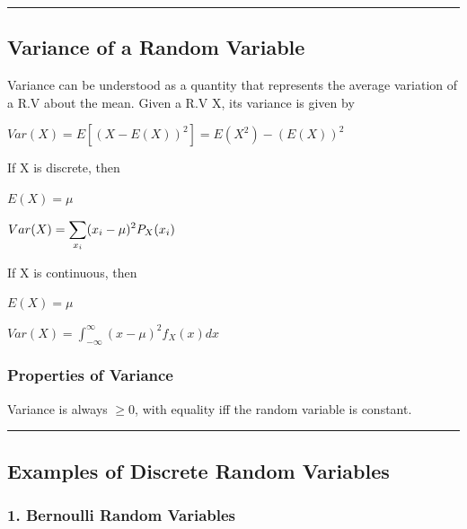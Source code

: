 \begin{center}\rule{0.5\linewidth}{0.5pt}\end{center}

\hypertarget{variance-of-a-random-variable}{%
\subsection{Variance of a Random
Variable}\label{variance-of-a-random-variable}}

Variance can be understood as a quantity that represents the average
variation of a R.V about the mean. Given a R.V X, its variance is given
by

\(Var(X) = E[(X - E(X))^2] = E(X^2) - (E(X))^2\)

If X is discrete, then

\(E(X) = \mu\)

\(Var(X) = \displaystyle\displaystyle\sum_{x_i}(x_i-\mu)^2P_X(x_i)\)

If X is continuous, then

\(E(X) = \mu\)

\(Var(X) = \displaystyle\int_{-\infty}^{\infty}(x-\mu)^2f_X(x)dx\)

\hypertarget{properties-of-variance}{%
\subsubsection{Properties of Variance}\label{properties-of-variance}}

Variance is always \(\geq0\), with equality iff the random variable is
constant.

\begin{center}\rule{0.5\linewidth}{0.5pt}\end{center}

\hypertarget{examples-of-discrete-random-variables}{%
\subsection{Examples of Discrete Random
Variables}\label{examples-of-discrete-random-variables}}

\hypertarget{bernoulli-random-variables}{%
\subsubsection{1. Bernoulli Random
Variables}\label{bernoulli-random-variables}}

